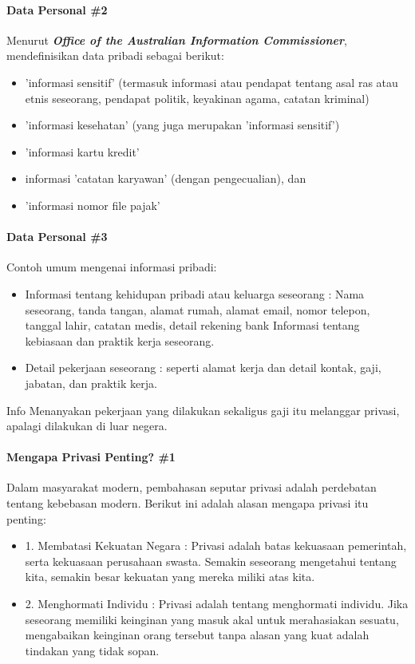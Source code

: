 \begin{frame}{\insertsectionhead}
	\framesubtitle{Data Personal \#2}
	\justifying
	Menurut \textbf{\textit{Office of the Australian Information Commissioner}}, mendefinisikan data pribadi sebagai berikut:
	\vfill
	\begin{itemize}
		\item 'informasi sensitif' (termasuk informasi atau pendapat tentang asal ras atau etnis seseorang, pendapat politik, keyakinan agama, catatan kriminal)
		\item 'informasi kesehatan' (yang juga merupakan 'informasi sensitif')
		\item 'informasi kartu kredit'
		\item informasi 'catatan karyawan' (dengan pengecualian), dan
		\item 'informasi nomor file pajak'
	\end{itemize}
\end{frame}

\begin{frame}{\insertsectionhead}
	\framesubtitle{Data Personal \#3}
	\justifying
	Contoh umum mengenai informasi pribadi:
	\vfill
	\begin{itemize}
		\item Informasi tentang kehidupan pribadi atau keluarga seseorang : Nama seseorang, tanda tangan, alamat rumah, alamat email, nomor telepon, tanggal lahir, catatan medis, detail rekening bank
		Informasi tentang kebiasaan dan praktik kerja seseorang.
		\item Detail pekerjaan seseorang : seperti alamat kerja dan detail kontak, gaji, jabatan, dan praktik kerja.
	\end{itemize}
	\vfill
	\begin{block}{Info}
		Menanyakan pekerjaan yang dilakukan sekaligus gaji itu melanggar privasi, apalagi dilakukan di luar negera.
	\end{block}
\end{frame}

\begin{frame}{\insertsectionhead}
	\framesubtitle{Mengapa Privasi Penting? \#1}
	\justifying
	Dalam masyarakat modern, pembahasan seputar privasi adalah perdebatan tentang kebebasan modern. Berikut ini adalah alasan mengapa privasi itu penting:
	\vfill
	\begin{itemize}
		\item 1. Membatasi Kekuatan Negara : Privasi adalah batas kekuasaan pemerintah, serta kekuasaan perusahaan swasta. Semakin seseorang mengetahui tentang kita, semakin besar kekuatan yang mereka miliki atas kita.
		\item 2. Menghormati Individu : Privasi adalah tentang menghormati individu. Jika seseorang memiliki keinginan yang masuk akal untuk merahasiakan sesuatu, mengabaikan keinginan orang tersebut tanpa alasan yang kuat adalah tindakan yang tidak sopan.
	\end{itemize}
\end{frame}

